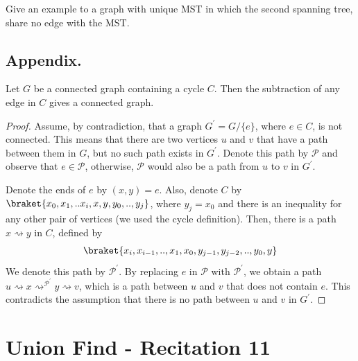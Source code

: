 \begin{problem}
  Give an example to a graph with unique MST in which the second spanning tree, share no edge with the MST. 
\end{problem}

\subsection{Appendix.}

\begin{claim}
  \label{claim:subtract}
  Let $G$ be a connected graph containing a cycle $C$. Then the subtraction of any edge in $C$ gives a connected graph. 
\end{claim}
\begin{proof}
Assume, by contradiction, that a graph $G^{\prime} = G / \{ e \} $, where $e \in C$, is not connected. This means that there are two vertices $u$ and $v$ that have a path between them in $G$, but no such path exists in $G^{\prime}$. Denote this path by $\mathcal{P}$ and observe that $e \in \mathcal{P}$, otherwise, $\mathcal{P}$ would also be a path from $u$ to $v$ in $G^{\prime}$.

Denote the ends of $e$ by $(x,y)=e$. Also, denote $C$ by $\braket{x_{0},x_{1},..x_{i},x,y,y_{0},..,y_{j}}$, where $y_{j}=x_{0}$ and there is an inequality for any other pair of vertices (we used the cycle definition). Then, there is a path $x \rightsquigarrow y$ in $C$, defined by 
\begin{equation*}
  \begin{split}
\braket{x_{i},x_{i-1},..,x_{1},x_{0},y_{j-1},y_{j-2},..,y_{0},y}
  \end{split}
\end{equation*}
 We denote this path by $\mathcal{P}^{\prime}$. By replacing $e$ in $\mathcal{P}$ with $\mathcal{P}^{\prime}$, we obtain a path $u \rightsquigarrow x \rightsquigarrow^{\mathcal{P}^\prime} y \rightsquigarrow v$, which is a path between $u$ and $v$ that does not contain $e$. This contradicts the assumption that there is no path between $u$ and $v$ in $G^{\prime}$.
\end{proof}






\section{Union Find - Recitation 11} 

\usetikzlibrary{positioning, arrows}

